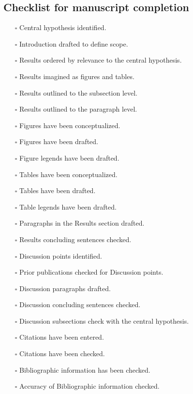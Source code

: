 \documentclass[11pt,letterpaper]{article}
\begin{document}
\subsection{Checklist for manuscript completion}
\label{sec:orgc158535}


\begin{itemize}
\item[{$\square$}] Central hypothesis identified.
\item[{$\square$}] Introduction drafted to define scope.
\item[{$\square$}] Results ordered by relevance to the central hypothesis.
\item[{$\square$}] Results imagined as figures and tables.
\item[{$\square$}] Results outlined to the subsection level.
\item[{$\square$}] Results outlined to the paragraph level.
\item[{$\square$}] Figures have been conceptualized.
\item[{$\square$}] Figures have been drafted.
\item[{$\square$}] Figure legends have been drafted.
\item[{$\square$}] Tables have been conceptualized.
\item[{$\square$}] Tables have been drafted.
\item[{$\square$}] Table legends have been drafted.
\item[{$\square$}] Paragraphs in the Results section drafted.
\item[{$\square$}] Results concluding sentences checked.
\item[{$\square$}] Discussion points identified.
\item[{$\square$}] Prior publications checked for Discussion points.
\item[{$\square$}] Discussion paragraphs drafted.
\item[{$\square$}] Discussion concluding sentences checked.
\item[{$\square$}] Discussion subsections check with the central hypothesis.
\item[{$\square$}] Citations have been entered.
\item[{$\square$}] Citations have been checked.
\item[{$\square$}] Bibliographic information has been checked.
\item[{$\square$}] Accuracy of Bibliographic information checked.

\end{itemize}
\end{document}
